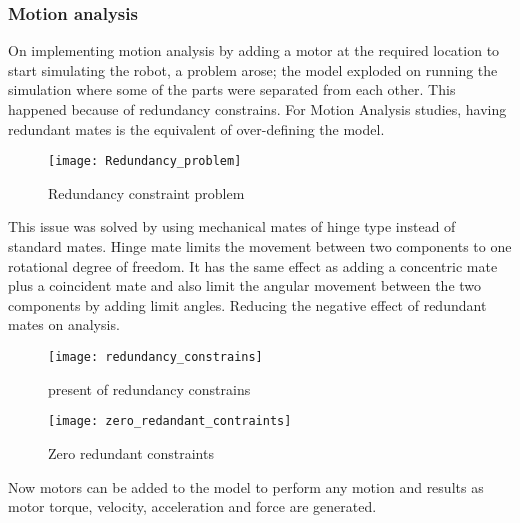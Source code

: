 \documentclass{book}
\begin{document}
\newpage
\subsubsection{Motion analysis}
 On implementing motion analysis by adding a motor at the required location to start simulating the robot, a problem arose; the model exploded on running the simulation where some of the parts were separated from each other. This happened because of redundancy constrains. For Motion Analysis studies, having redundant mates is the equivalent of over-defining the model.  

\begin{figure}[h]
	
	\caption{Redundancy constraint problem}
	\centering
	\texttt{[image: Redundancy\_problem]}
\end{figure}

 This issue was solved by using mechanical mates of hinge type instead of standard mates. Hinge mate limits the movement between two components to one rotational degree of freedom. It has the same effect as adding a concentric mate plus a coincident mate and also limit the angular movement between the two components by adding limit angles. Reducing the negative effect of redundant mates on analysis.
\begin{figure}
	
	\caption{present of redundancy constrains}
	\centering
	\texttt{[image: redundancy\_constrains]}
\end{figure}
\begin{figure}
	
	\caption{Zero redundant constraints}
	\centering
	\texttt{[image: zero\_redandant\_contraints]}
\end{figure}
\newpage
 Now motors can be added to the model to perform any motion and results as motor torque, velocity, acceleration and force are generated.
 
\end{document}
